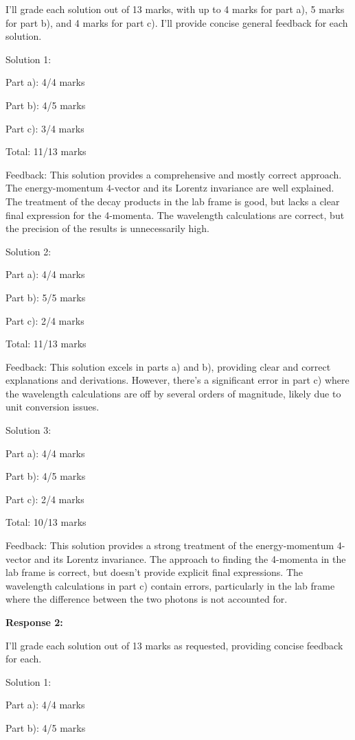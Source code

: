 \documentclass[a4paper,11pt]{article}
\begin{document}
I'll grade each solution out of 13 marks, with up to 4 marks for part a), 5 marks for part b), and 4 marks for part c). I'll provide concise general feedback for each solution.

Solution 1:

Part a): 4/4 marks

Part b): 4/5 marks

Part c): 3/4 marks

Total: 11/13 marks

Feedback: This solution provides a comprehensive and mostly correct approach. The energy-momentum 4-vector and its Lorentz invariance are well explained. The treatment of the decay products in the lab frame is good, but lacks a clear final expression for the 4-momenta. The wavelength calculations are correct, but the precision of the results is unnecessarily high.

Solution 2:

Part a): 4/4 marks

Part b): 5/5 marks

Part c): 2/4 marks

Total: 11/13 marks

Feedback: This solution excels in parts a) and b), providing clear and correct explanations and derivations. However, there's a significant error in part c) where the wavelength calculations are off by several orders of magnitude, likely due to unit conversion issues.

Solution 3:

Part a): 4/4 marks

Part b): 4/5 marks

Part c): 2/4 marks

Total: 10/13 marks

Feedback: This solution provides a strong treatment of the energy-momentum 4-vector and its Lorentz invariance. The approach to finding the 4-momenta in the lab frame is correct, but doesn't provide explicit final expressions. The wavelength calculations in part c) contain errors, particularly in the lab frame where the difference between the two photons is not accounted for.

\bigskip
\textbf{Response 2:}

I'll grade each solution out of 13 marks as requested, providing concise feedback for each.

Solution 1:

Part a): 4/4 marks

Part b): 4/5 marks
\end{document}
